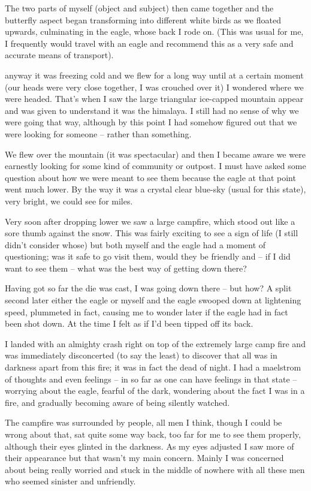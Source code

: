 \begin{footnotesize}
\begin{sffamily}
The two parts of myself (object and subject) then came together and the butterfly aspect began transforming into different white birds as we floated upwards, culminating in the eagle, whose back I rode on. (This was usual for me, I frequently would travel with an eagle and recommend this as a very safe and accurate means of transport).

anyway it was freezing cold and we flew for a long way until at a certain moment (our heads were very close together, I was crouched over it) I wondered where we were headed. That's when I saw the large triangular ice-capped mountain appear and was given to understand it was the himalaya. I still had no sense of why we were going that way, although by this point I had somehow figured out that we were looking for someone -- rather than something.

We flew over the mountain (it was spectacular) and then I became aware we were earnestly looking for some kind of community or outpost. I must have asked some question about how we were meant to see them because the eagle at that point went much lower. By the way it was a crystal clear blue-sky (usual for this state), very bright, we could see for miles.

Very soon after dropping lower we saw a large campfire, which stood out like a sore thumb against the snow. This was fairly exciting to see a sign of life (I still didn't consider whose) but both myself and the eagle had a moment of questioning; was it safe to go visit them, would they be friendly and -- if I did want to see them -- what was the best way of getting down there?

Having got so far the die was cast, I was going down there -- but how? A split second later either the eagle or myself and the eagle swooped down at lightening speed, plummeted in fact, causing me to wonder later if the eagle had in fact been shot down. At the time I felt as if I'd been tipped off its back.

I landed with an almighty crash right on top of the extremely large camp fire and was immediately disconcerted (to say the least) to discover that all was in darkness apart from this fire; it was in fact the dead of night. I had a maelstrom of thoughts and even feelings -- in so far as one can have feelings in that state -- worrying about the eagle, fearful of the dark, wondering about the fact I was in a fire, and gradually becoming aware of being silently watched.

The campfire was surrounded by people, all men I think, though I could be wrong about that, sat quite some way back, too far for me to see them properly, although their eyes glinted in the darkness. As my eyes adjusted I saw more of their appearance but that wasn't my main concern. Mainly I was concerned about being really worried and stuck in the middle of nowhere with all these men who seemed sinister and unfriendly.


\end{sffamily}
\end{footnotesize}
